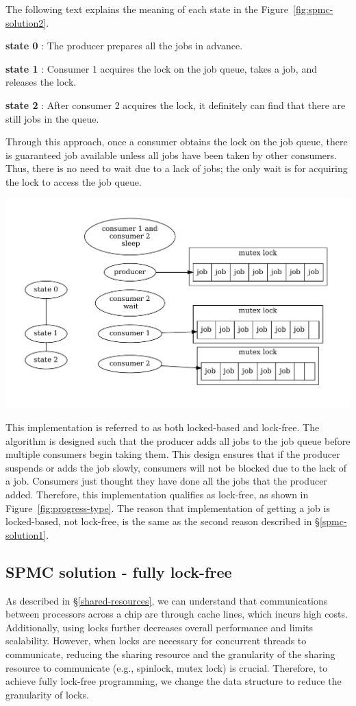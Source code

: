 \documentclass[fontsize=10pt, oneside]{scrartcl}
\newcommand{\fig}[1]{Figure~\ref{#1}}
\newcommand{\secref}[1]{\hyperref[#1]{\textsc{\S}\ref*{#1}}}
\begin{document}
The following text explains the meaning of each state in the \fig{fig:spmc-solution2}.

\textbf{state 0} : The producer prepares all the jobs in advance.

\textbf{state 1} : Consumer 1 acquires the lock on the job queue, takes a job, and releases the lock.

\textbf{state 2} : After consumer 2 acquires the lock, it definitely can find that there are still jobs in the queue.

Through this approach, once a consumer obtains the lock on the job queue, 
there is guaranteed job available unless all jobs have been taken by other consumers.
Thus, there is no need to wait due to a lack of jobs; 
the only wait is for acquiring the lock to access the job queue.

\includegraphics[keepaspectratio, width=0.7\linewidth]{images/spmc-solution2}
\label{fig:spmc-solution2}

This implementation is referred to as both locked-based and lock-free. 
The algorithm is designed such that the producer adds all jobs to the job queue before multiple consumers begin taking them. 
This design ensures that if the producer suspends or adds the job slowly, 
consumers will not be blocked due to the lack of a job. 
Consumers just thought they have done all the jobs that the producer added.
Therefore, this implementation qualifies as lock-free, as shown in \fig{fig:progress-type}.
The reason that implementation of getting a job is locked-based, not lock-free,  
is the same as the second reason described in \secref{spmc-solution1}.

\subsection{SPMC solution - fully lock-free}
\label{spmc-solution3}
As described in \secref{shared-resources}, 
we can understand that communications between processors across a chip are through cache lines, 
which incurs high costs. Additionally, using locks further decreases overall performance and limits scalability.
However, when locks are necessary for concurrent threads to communicate, 
reducing the sharing resource and the granularity of the sharing resource to communicate (e.g., spinlock, mutex lock) is crucial.
Therefore, to achieve fully lock-free programming, we change the data structure to reduce the granularity of locks.
\end{document}
